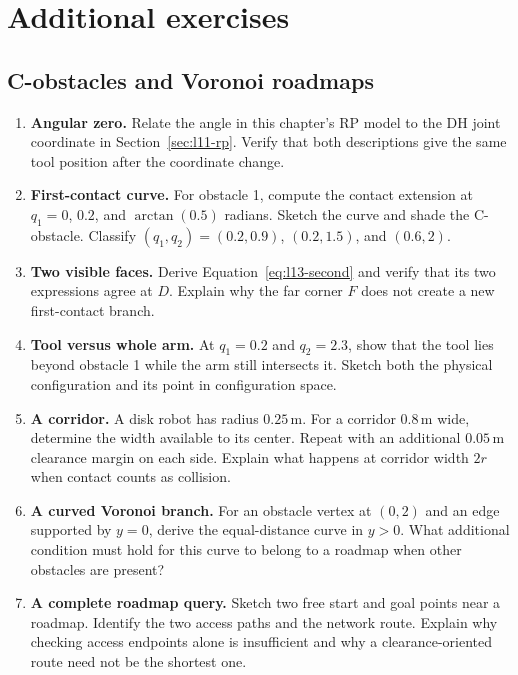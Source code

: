 


\clearpage
\section{Additional exercises}
\subsection{C-obstacles and Voronoi roadmaps}
\begin{enumerate}
\item \textbf{Angular zero.} Relate the angle in this chapter's RP model
to the DH joint coordinate in Section~\ref{sec:l11-rp}. Verify that both
descriptions give the same tool position after the coordinate change.
\item \textbf{First-contact curve.} For obstacle 1, compute the contact
extension at $q_1=0$, $0.2$, and $\arctan(0.5)$ radians. Sketch the curve
and shade the C-obstacle. Classify $(q_1,q_2)=(0.2,0.9)$, $(0.2,1.5)$,
and $(0.6,2)$.
\item \textbf{Two visible faces.} Derive Equation~\eqref{eq:l13-second}
and verify that its two expressions agree at $D$. Explain why the far
corner $F$ does not create a new first-contact branch.
\item \textbf{Tool versus whole arm.} At $q_1=0.2$ and $q_2=2.3$, show
that the tool lies beyond obstacle 1 while the arm still intersects it.
Sketch both the physical configuration and its point in configuration space.
\item \textbf{A corridor.} A disk robot has radius $0.25\,\mathrm m$.
For a corridor $0.8\,\mathrm m$ wide, determine the width available to
its center. Repeat with an additional $0.05\,\mathrm m$ clearance margin
on each side. Explain what happens at corridor width $2r$ when contact
counts as collision.
\item \textbf{A curved Voronoi branch.} For an obstacle vertex at $(0,2)$
and an edge supported by $y=0$, derive the equal-distance curve in $y>0$.
What additional condition must hold for this curve to belong to a roadmap
when other obstacles are present?
\item \textbf{A complete roadmap query.} Sketch two free start and goal
points near a roadmap. Identify the two access paths and the network
route. Explain why checking access endpoints alone is insufficient and
why a clearance-oriented route need not be the shortest one.
\end{enumerate}
\clearpage
